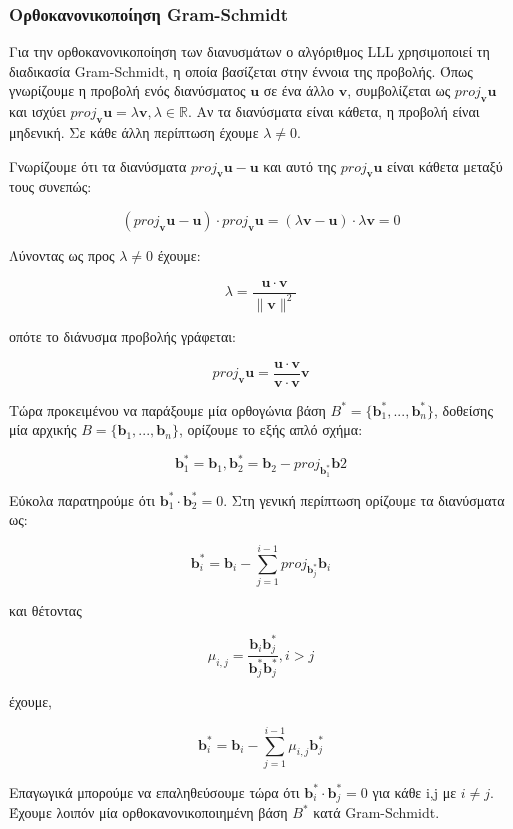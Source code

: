\subsubsection{Ορθοκανονικοποίηση \lt Gram-Schmidt}

Για την ορθοκανονικοποίηση των διανυσμάτων ο αλγόριθμος LLL χρησιμοποιεί τη διαδικασία Gram-Schmidt, η οποία βασίζεται στην έννοια της προβολής. Όπως γνωρίζουμε η προβολή ενός διανύσματος $ \bm u $ σε ένα άλλο $ \bm v $, συμβολίζεται ως $ proj_{\bm v} \bm u $ και ισχύει $ proj_{\bm v} \bm u = λ \bm v, λ \in \mathbb{R} $. Αν τα διανύσματα είναι κάθετα, η προβολή είναι μηδενική. Σε κάθε άλλη περίπτωση έχουμε $ λ \neq 0 $. 

Γνωρίζουμε ότι τα διανύσματα $ proj_{\bm v} \bm u  - \bm u $ και αυτό της $ proj_{\bm v} \bm u $ είναι κάθετα μεταξύ τους συνεπώς:

$$ (proj_{\bm v} \bm u  - \bm u) \cdot proj_{\bm v} \bm u = (λ \bm v  - \bm u) \cdot λ \bm v = 0 $$

Λύνοντας ως προς $ λ \neq 0 $ έχουμε:

$$ λ = \dfrac{\bm u \cdot \bm v}{\| \bm v \|^2} $$

οπότε το διάνυσμα προβολής γράφεται:

$$ proj_{\bm v} \bm u = \dfrac{\bm u \cdot \bm v}{\bm v \cdot \bm v} \bm v$$

Τώρα προκειμένου να παράξουμε μία ορθογώνια βάση $ B^* = \{\bm b_1^*, ..., \bm b_n^* \} $, δοθείσης μία αρχικής $ B = \{\bm b_1, ..., \bm b_n \} $, ορίζουμε το εξής απλό σχήμα:

$$\bm b_1^* = \bm b_1, \bm b_2^* = \bm b_2 - proj_{\bm b_1 ^*} \bm b2 $$

Εύκολα παρατηρούμε ότι $\bm b_1^* \cdot \bm b_2^* = 0 $. Στη γενική περίπτωση ορίζουμε τα διανύσματα ως:

$$ \bm b_i^* = \bm b_i - \sum_{j=1}^{i-1}proj_{\bm b_j^*} \bm b_i $$

και θέτοντας 

$$ μ_{i,j} = \dfrac{\bm b_i \bm b_j^*}{\bm b_j^* \bm b_j^*}, i > j $$

έχουμε,

$$ \bm b_i^* = \bm b_i - \sum_{j=1}^{i-1} μ_{i,j} \bm b_j^* $$

Επαγωγικά μπορούμε να επαληθεύσουμε τώρα ότι $ \bm b_i^* \cdot \bm b_j^* = 0 $ για κάθε i,j με $ i \neq j $. Έχουμε λοιπόν μία ορθοκανονικοποιημένη βάση $ Β^* $ κατά Gram-Schmidt. 


